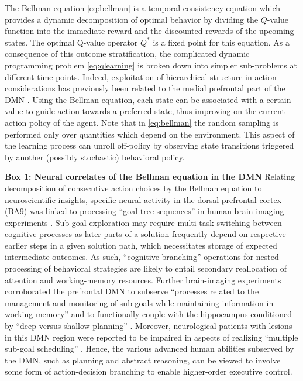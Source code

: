 \documentclass[10pt,letterpaper]{article}
\begin{document}
The Bellman equation \eqref{eq:bellman} is a temporal consistency equation which provides
a dynamic decomposition of optimal behavior by dividing the $Q$-value function into the immediate
reward and the discounted rewards of the upcoming states.
The optimal Q-value operator $Q^*$ is a fixed point for this equation.
As a consequence of this outcome stratification, the complicated dynamic programming
problem \eqref{eq:qlearning}
is broken down into simpler sub-problems at different time points.
Indeed,
exploitation of hierarchical structure in action considerations
has previously been related to the medial prefrontal part of the DMN
\citep{koechlin1999role, braver2002role}.
Using the Bellman equation, each state can be associated with a certain value
to guide action towards a preferred state, thus improving on the
current action policy of the agent.
Note that in \eqref{eq:bellman} the random sampling
is performed only over quantities which
depend on the environment.
This aspect of the learning process
can unroll off-policy by observing state transitions
triggered by another (possibly stochastic) behavioral policy.

\begin{mdframed}
  \vspace{2em}
  \textbf{Box 1: Neural correlates of the Bellman equation in the DMN}
Relating decomposition of consecutive action choices by the Bellman equation
to neuroscientific insights,
specific neural activity in the dorsal prefrontal cortex (BA9)
was linked to processing ``goal-tree sequences''
in human brain-imaging experiments
\citep{koechlin1999role, koechlin2000dissociating}.
Sub-goal exploration may require multi-task switching
between cognitive processes
as later parts of a solution
frequently depend on respective earlier steps in a given solution path, which
necessitates storage of expected intermediate outcomes.
As such,
``cognitive branching'' operations for nested processing of behavioral strategies
are likely to
entail secondary reallocation of attention and working-memory resources.
Further brain-imaging experiments corroborated
the prefrontal DMN to subserve
``processes related to the management and monitoring of sub-goals while
maintaining information in working memory''
\citep{braver2002role}
and to functionally couple with the hippocampus conditioned by ``deep versus shallow planning''
\citep{kaplan2017neural}.
%
Moreover,
neurological patients with lesions in this DMN region were reported
to be impaired in aspects of realizing ``multiple sub-goal scheduling''
\citep{burgess2000cognitive}.
Hence,
the various advanced human abilities subserved by the DMN, such as
planning and abstract reasoning, can be viewed to involve some form of
action-decision branching to enable higher-order executive control.
\end{mdframed}
\end{document}
